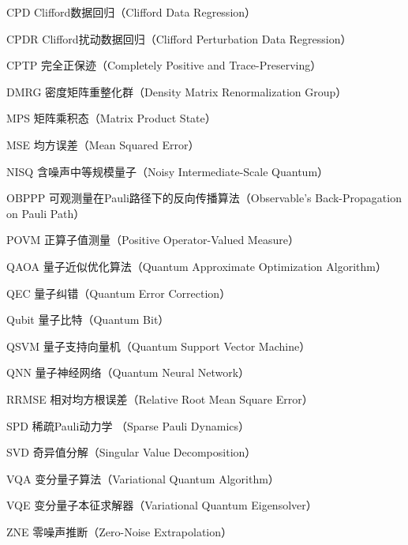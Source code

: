 
\begin{denotation}[3cm]
  \item[CPD] Clifford数据回归（Clifford Data Regression）
  \item[CPDR] Clifford扰动数据回归（Clifford Perturbation Data Regression）
  \item[CPTP] 完全正保迹（Completely Positive and Trace-Preserving） 
  \item[DMRG] 密度矩阵重整化群（Density Matrix Renormalization Group）
  \item[MPS] 矩阵乘积态（Matrix Product State） 
  \item[MSE] 均方误差（Mean Squared Error） 
  \item[NISQ] 含噪声中等规模量子（Noisy Intermediate-Scale Quantum）
  \item[OBPPP] 可观测量在Pauli路径下的反向传播算法（Observable's Back-Propagation on Pauli Path）
  \item[POVM] 正算子值测量（Positive Operator-Valued Measure）
  \item[QAOA] 量子近似优化算法（Quantum Approximate Optimization Algorithm）
  \item[QEC] 量子纠错（Quantum Error Correction）
  \item[Qubit] 量子比特（Quantum Bit）
  \item[QSVM] 量子支持向量机（Quantum Support Vector Machine） 
  \item[QNN] 量子神经网络（Quantum Neural Network） 
  \item[RRMSE] 相对均方根误差（Relative Root Mean Square Error） 
  \item[SPD] 稀疏Pauli动力学 （Sparse Pauli Dynamics）
  \item[SVD] 奇异值分解（Singular Value Decomposition）
  \item[VQA] 变分量子算法（Variational Quantum Algorithm） 
  \item[VQE] 变分量子本征求解器（Variational Quantum Eigensolver）
  \item[ZNE] 零噪声推断（Zero-Noise Extrapolation）
  
  
\end{denotation}





